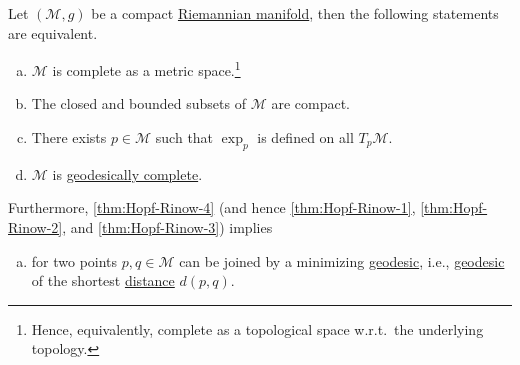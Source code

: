 \begin{theorem}\label{thm:Hopf-Rinow}
	Let \((\mathcal{M} , g)\) be a compact \hyperref[def:Riemannian-manifold]{Riemannian manifold}, then the following statements are equivalent.
	\begin{enumerate}[(a)]
		\item\label{thm:Hopf-Rinow-1} \(\mathcal{M} \) is complete as a metric space.\footnote{Hence, equivalently, complete as a topological space w.r.t.\ the underlying topology.}
		\item\label{thm:Hopf-Rinow-2} The closed and bounded subsets of \(\mathcal{M} \) are compact.
		\item\label{thm:Hopf-Rinow-3} There exists \(p\in \mathcal{M} \) such that \(\exp _p\) is defined on all \(T_p \mathcal{M} \).
		\item\label{thm:Hopf-Rinow-4} \(\mathcal{M} \) is \hyperref[def:geodesically-complete]{geodesically complete}.
	\end{enumerate}
	Furthermore, \autoref{thm:Hopf-Rinow-4} (and hence \autoref{thm:Hopf-Rinow-1}, \autoref{thm:Hopf-Rinow-2}, and \autoref{thm:Hopf-Rinow-3}) implies
	\begin{enumerate}[(e)]
		\item\label{thm:Hopf-Rinow-5} for two points \(p, q\in \mathcal{M} \) can be joined by a minimizing \hyperref[def:geodesic]{geodesic}, i.e., \hyperref[def:geodesic]{geodesic} of the shortest \hyperref[def:distance]{distance} \(d(p, q)\).
	\end{enumerate}
\end{theorem}

